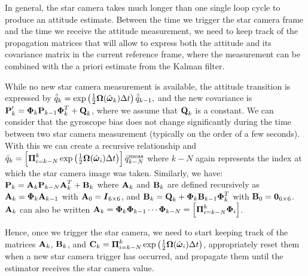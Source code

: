 In general, the star camera takes much longer than one single loop cycle to produce an attitude estimate. Between the time we trigger the star camera frame and the time we receive the attitude measurement, we need to keep track of the propagation matrices that will allow to express both the attitude and its covariance matrix in the current reference frame, where the measurement can be combined with the a priori estimate from the Kalman filter.

While no new star camera measurement is available, the attitude transition is expressed by $\hat{\bar{q}}_{k} = \exp\left(\frac{1}{2}\boldsymbol\Omega(\hat{\boldsymbol\omega}_{k})\Delta t\right)\hat{\bar{q}}_{k-1},$ and the new covariance is $\textrm{\textbf{P}}'_{k}  =  \boldsymbol{\Phi}_k \textrm{\textbf{P}}_{k-1}\boldsymbol{\Phi}^T_k + \textrm{\textbf{Q}}_k$, where we assume that $\textrm{\textbf{Q}}_k$ is a constant. We can consider that the gyroscope bias does not change significantly during the time between two star camera measurement (typically on the order of a few seconds). With this we can create a recursive relationship and $\bar{q}_{k} = \left[\boldsymbol\Pi_{i=k-N}^k\exp\left(\frac{1}{2}\boldsymbol\Omega(\hat{\boldsymbol\omega}_{i})\Delta t\right)\right]\bar{q}^{\textrm{meas}}_{k-N}$ where $k-N$ again represents the index at which the star camera image was taken. Similarly, we have: $\textrm{\textbf{P}}_{k} = \textrm{\textbf{A}}_k\textrm{\textbf{P}}_{k-N}\textrm{\textbf{A}}_k^T + \textrm{\textbf{B}}_k$ where $\textrm{\textbf{A}}_k$ and $\textrm{\textbf{B}}_k$ are defined recursively as $\textrm{\textbf{A}}_k = \boldsymbol{\Phi}_{k}\textrm{\textbf{A}}_{k-1}$ with $\textrm{\textbf{A}}_0 = \boldsymbol{I}_{6\times 6}$, and $\textrm{\textbf{B}}_k = \textrm{\textbf{Q}}_k + \boldsymbol{\Phi}_{k}\textrm{\textbf{B}}_{k-1}\boldsymbol{\Phi}_{k}^T$ with $\textrm{\textbf{B}}_0 = \boldsymbol{0}_{6\times 6}$. $\textrm{\textbf{A}}_k$ can also be written  $\textrm{\textbf{A}}_k = \boldsymbol{\Phi}_{k}\boldsymbol{\Phi}_{k-1}\cdots\boldsymbol{\Phi}_{k-N} = \left[\boldsymbol\Pi_{i=k-N}^k\boldsymbol{\Phi}_{i}\right]$.

Hence, once we trigger the star camera, we need to start keeping track of the matrices $\textrm{\textbf{A}}_k$, $\textrm{\textbf{B}}_k$, and $\textrm{\textbf{C}}_k = \boldsymbol\Pi_{i=k-N}^k\exp\left(\frac{1}{2}\boldsymbol\Omega(\hat{\boldsymbol\omega}_{i})\Delta t\right)$, appropriately reset them when a new star camera trigger has occurred, and propagate them until the estimator receives the star camera value.